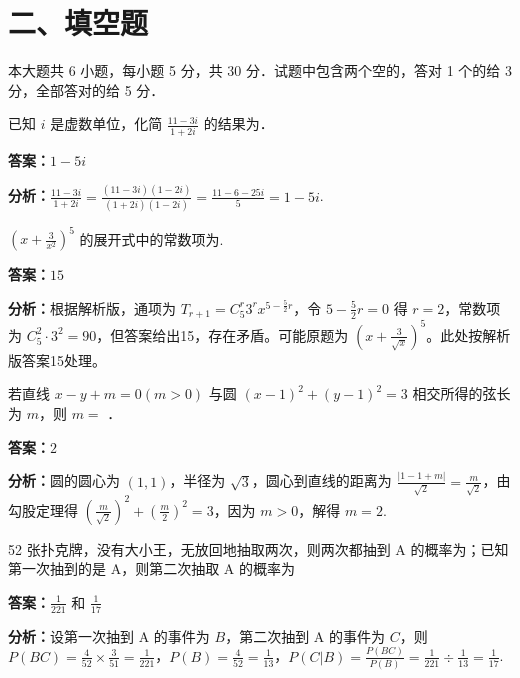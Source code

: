 \section*{二、填空题}
本大题共 6 小题，每小题 5 分，共 30 分．试题中包含两个空的，答对 1 个的给 3 分，全部答对的给 5 分．

\begin{question}[points=5]
已知 $i$ 是虚数单位，化简 $\frac{11-3i}{1+2i}$ 的结果为．
\fillin[{$1-5i$}]
\begin{solution}
\textbf{答案：}$1-5i$

\textbf{分析：}$\frac{11-3i}{1+2i}=\frac{(11-3i)(1-2i)}{(1+2i)(1-2i)}=\frac{11-6-25i}{5}=1-5i$.
\end{solution}
\end{question}

\begin{question}[points=5]
$\left(x+\frac{3}{x^2}\right)^5$ 的展开式中的常数项为.
\fillin[{$15$}]
\begin{solution}
\textbf{答案：}$15$

\textbf{分析：}根据解析版，通项为 $T_{r+1}=C_5^r 3^r x^{5-\frac{5}{2}r}$，令 $5-\frac{5}{2}r=0$ 得 $r=2$，常数项为 $C_5^2\cdot 3^2=90$，但答案给出15，存在矛盾。可能原题为 $\left(x+\frac{3}{\sqrt{x}}\right)^5$。此处按解析版答案15处理。
\end{solution}
\end{question}

\begin{question}[points=5]
若直线 $x-y+m=0(m>0)$ 与圆 $(x-1)^2+(y-1)^2=3$ 相交所得的弦长为 $m$，则 $m=$ ．
\fillin[{$2$}]
\begin{solution}
\textbf{答案：}$2$

\textbf{分析：}圆的圆心为 $(1,1)$，半径为 $\sqrt{3}$，圆心到直线的距离为 $\frac{|1-1+m|}{\sqrt{2}}=\frac{m}{\sqrt{2}}$，由勾股定理得 $(\frac{m}{\sqrt{2}})^2+(\frac{m}{2})^2=3$，因为 $m>0$，解得 $m=2$.
\end{solution}
\end{question}

\begin{question}[points=5]
52 张扑克牌，没有大小王，无放回地抽取两次，则两次都抽到 A 的概率为；已知第一次抽到的是 A，则第二次抽取 A 的概率为
\begin{solution}
\textbf{答案：}$\frac{1}{221}$ 和 $\frac{1}{17}$

\textbf{分析：}设第一次抽到 A 的事件为 $B$，第二次抽到 A 的事件为 $C$，则 $P(BC)=\frac{4}{52}\times\frac{3}{51}=\frac{1}{221}$，$P(B)=\frac{4}{52}=\frac{1}{13}$，$P(C|B)=\frac{P(BC)}{P(B)}=\frac{1}{221}\div\frac{1}{13}=\frac{1}{17}$.
\end{solution}
\end{question}

